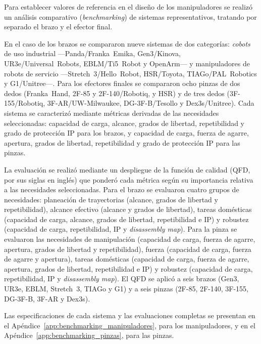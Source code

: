 Para establecer valores de referencia en el diseño de los manipuladores se realizó un análisis comparativo (\emph{benchmarking}) de sistemas representativos, tratando por separado el brazo y el efector final.

En el caso de los brazos se compararon nueve sistemas de dos categorías: \textit{cobots} de uso industrial ---Panda\slash Franka~Emika, Gen3\slash Kinova, UR3e\slash Universal~Robots, EBLM\slash Ti5~Robot y OpenArm--- y manipuladores de robots de servicio ---Stretch~3\slash Hello~Robot, HSR\slash Toyota, TIAGo\slash PAL~Robotics y G1\slash Unitree---. Para los efectores finales se compararon ocho pinzas de dos dedos (Franka~Hand, 2F-85 y 2F-140\slash Robotiq, y HSR) y de tres dedos (3F-155\slash Robotiq, 3F-AR\slash UW-Milwaukee, DG-3F-B\slash Tesollo y Dex3s\slash Unitree). Cada sistema se caracterizó mediante métricas derivadas de las necesidades seleccionadas: capacidad de carga, alcance, grados de libertad, repetibilidad y grado de protección IP para los brazos, y capacidad de carga, fuerza de agarre, apertura, grados de libertad, repetibilidad y grado de protección IP para las pinzas.

La evaluación se realizó mediante un despliegue de la función de calidad (QFD, por sus siglas en inglés) que ponderó cada métrica según su importancia relativa a las necesidades seleccionadas. Para el brazo se evaluaron cuatro grupos de necesidades: planeación de trayectorias (alcance, grados de libertad y repetibilidad), alcance efectivo (alcance y grados de libertad), tareas domésticas (capacidad de carga, alcance, grados de libertad, repetibilidad e IP) y robustez (capacidad de carga, repetibilidad, IP y \textit{disassembly map}). Para la pinza se evaluaron las necesidades de manipulación (capacidad de carga, fuerza de agarre, apertura, grados de libertad y repetibilidad), fuerza (capacidad de carga, fuerza de agarre y apertura), tareas domésticas (capacidad de carga, fuerza de agarre, apertura, grados de libertad, repetibilidad e IP) y robustez (capacidad de carga, repetibilidad, IP y \textit{disassembly map}). El QFD se aplicó a seis brazos (Gen3, UR3e, EBLM, Stretch~3, TIAGo y G1) y a seis pinzas (2F-85, 2F-140, 3F-155, DG-3F-B, 3F-AR y Dex3s). %

Las especificaciones de cada sistema y las evaluaciones completas se presentan en el Apéndice~\ref{app:benchmarking_manipuladores}, para los manipuladores, y en el Apéndice~\ref{app:benchmarking_pinzas}, para las pinzas.

